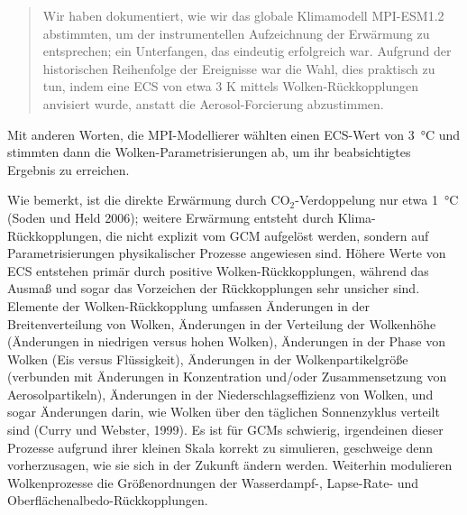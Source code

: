 \documentclass[12pt,paper=a4,DIV=12,parskip=never,chapterprefix=false,headings=standardclasses]{scrreprt}
\begin{document}
\begin{quote}
Wir haben dokumentiert, wie wir das globale Klimamodell MPI-ESM1.2 abstimmten, um der instrumentellen Aufzeichnung der Erwärmung zu entsprechen; ein Unterfangen, das eindeutig erfolgreich war. Aufgrund der historischen Reihenfolge der Ereignisse war die Wahl, dies praktisch zu tun, indem eine ECS von etwa 3 K mittels Wolken-Rückkopplungen anvisiert wurde, anstatt die Aerosol-Forcierung abzustimmen.  
\end{quote}

Mit anderen Worten, die MPI-Modellierer wählten einen ECS-Wert von \SI{3}{\celsius} und stimmten dann die Wolken-Parametrisierungen ab, um ihr beabsichtigtes Ergebnis zu erreichen.

Wie bemerkt, ist die direkte Erwärmung durch CO$_2$-Verdoppelung nur etwa \SI{1}{\celsius} (Soden und Held 2006); weitere Erwärmung entsteht durch Klima-Rückkopplungen, die nicht explizit vom GCM aufgelöst werden, sondern auf Parametrisierungen physikalischer Prozesse angewiesen sind. Höhere Werte von ECS entstehen primär durch positive Wolken-Rückkopplungen, während das Ausmaß und sogar das Vorzeichen der Rückkopplungen sehr unsicher sind. Elemente der Wolken-Rückkopplung umfassen Änderungen in der Breitenverteilung von Wolken, Änderungen in der Verteilung der Wolkenhöhe (Änderungen in niedrigen versus hohen Wolken), Änderungen in der Phase von Wolken (Eis versus Flüssigkeit), Änderungen in der Wolkenpartikelgröße (verbunden mit Änderungen in Konzentration und/oder Zusammensetzung von Aerosolpartikeln), Änderungen in der Niederschlagseffizienz von Wolken, und sogar Änderungen darin, wie Wolken über den täglichen Sonnenzyklus verteilt sind (Curry und Webster, 1999). Es ist für GCMs schwierig, irgendeinen dieser Prozesse aufgrund ihrer kleinen Skala korrekt zu simulieren, geschweige denn vorherzusagen, wie sie sich in der Zukunft ändern werden. Weiterhin modulieren Wolkenprozesse die Größenordnungen der Wasserdampf-, Lapse-Rate- und Oberflächenalbedo-Rückkopplungen.
\end{document}
